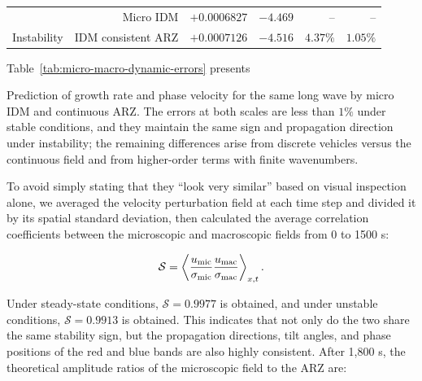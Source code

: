 \documentclass[11pt,a4paper,openany]{book}
\numberwithin{equation}{chapter}
\numberwithin{figure}{chapter}
\numberwithin{table}{chapter}
\newcommand{\tabletext}[2]{%
  \par\smallskip\noindent
  Table~\ref{#1} presents #2
\par\smallskip
}
\begin{document}
\begin{center}
\begin{tabular}{lrrrrr}
&




 Micro IDM




& $+0.0006827$ & $-4.469$ & -- & -- \\







Instability




&




 IDM consistent ARZ




& $+0.0007126$ & $-4.516$ & $4.37\%$ & $1.05\%$ \\
\bottomrule
\end{tabular}
\end{center}
\tabletext{tab:micro-macro-dynamic-errors}{




Prediction of growth rate and phase velocity for the same long wave by micro IDM and continuous ARZ. The errors at both scales are less than $1\%$ under stable conditions, and they maintain the same sign and propagation direction under instability; the remaining differences arise from discrete vehicles versus the continuous field and from higher-order terms with finite wavenumbers.}





To avoid simply stating that they “look very similar” based on visual inspection alone, we averaged the velocity perturbation field at each time step and divided it by its spatial standard deviation, then calculated the average correlation coefficients between the microscopic and macroscopic fields from 0 to 1500 s:

\begin{equation}
\mathcal S
=\left\langle
\frac{u_{\rm mic}}{\sigma_{\rm mic}}
\frac{u_{\rm mac}}{\sigma_{\rm mac}}
\right\rangle_{x,t}.
\label{eq:bridge-similarity}
\end{equation}

Under steady-state conditions, $\mathcal S=0.9977$ is obtained, and under unstable conditions, $\mathcal S=0.9913$ is obtained. This indicates that not only do the two share the same stability sign, but the propagation directions, tilt angles, and phase positions of the red and blue bands are also highly consistent. After 1,800 s, the theoretical amplitude ratios of the microscopic field to the ARZ are:
\end{document}
